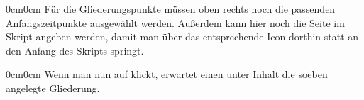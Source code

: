 \documentclass[parskip=off,index=totocnumbered]{scrartcl}
\newenvironment{rückkeinstück2}
	{\begin{adjustwidth}{0cm}{0cm}\footnotesize \singlespace} 
	{\end{adjustwidth} \onehalfspacing}
\begin{document}
\noindent \begin{minipage}{\textwidth}
    \vspace{0.6cm}
    \begin{rückkeinstück2}
        Für die Gliederungspunkte müssen oben rechts noch die passenden Anfangszeitpunkte ausgewählt werden. Außerdem kann hier noch die Seite im Skript angeben werden, damit man über das entsprechende Icon dorthin statt an den Anfang des Skripts springt.
    \end{rückkeinstück2}
\end{minipage}

\noindent \begin{minipage}{\textwidth}
    \vspace{0.6cm}
    \begin{rückkeinstück2}
        Wenn man nun auf  klickt, erwartet einen unter \textsf{Inhalt} die soeben angelegte Gliederung.
    \end{rückkeinstück2}
\end{minipage}
\end{document}
